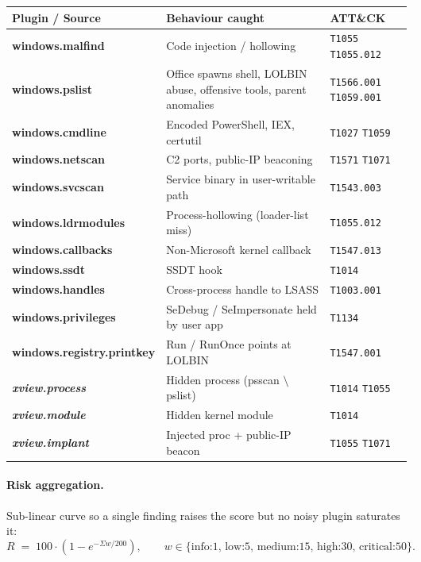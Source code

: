 \documentclass[11pt,a4paper]{article}
\newcommand{\mitre}[1]{\colorbox{accent!18}{\texttt{\footnotesize #1}}}
\begin{document}
\begin{center}
\renewcommand{\arraystretch}{1.2}
\begin{tabular}{>{\bfseries}p{3.2cm} p{6.2cm} p{4.6cm}}
\toprule
\textbf{Plugin / Source} & \textbf{Behaviour caught} & \textbf{ATT\&CK} \\
\midrule
windows.malfind        & Code injection / hollowing                   & \mitre{T1055} \mitre{T1055.012} \\
windows.pslist         & Office spawns shell, LOLBIN abuse,
                         offensive tools, parent anomalies            & \mitre{T1566.001} \mitre{T1059.001} \\
windows.cmdline        & Encoded PowerShell, IEX, certutil            & \mitre{T1027} \mitre{T1059} \\
windows.netscan        & C2 ports, public-IP beaconing                & \mitre{T1571} \mitre{T1071} \\
windows.svcscan        & Service binary in user-writable path         & \mitre{T1543.003} \\
windows.ldrmodules     & Process-hollowing (loader-list miss)         & \mitre{T1055.012} \\
windows.callbacks      & Non-Microsoft kernel callback                & \mitre{T1547.013} \\
windows.ssdt           & SSDT hook                                    & \mitre{T1014} \\
windows.handles        & Cross-process handle to LSASS                & \mitre{T1003.001} \\
windows.privileges     & SeDebug / SeImpersonate held by user app     & \mitre{T1134} \\
windows.registry.printkey & Run / RunOnce points at LOLBIN            & \mitre{T1547.001} \\
\textit{xview.process} & Hidden process (psscan $\setminus$ pslist)   & \mitre{T1014} \mitre{T1055} \\
\textit{xview.module}  & Hidden kernel module                         & \mitre{T1014} \\
\textit{xview.implant} & Injected proc + public-IP beacon             & \mitre{T1055} \mitre{T1071} \\
\bottomrule
\end{tabular}
\end{center}

\paragraph{Risk aggregation.} Sub-linear curve so a single finding raises the
score but no noisy plugin saturates it:
\[
R \;=\; 100 \cdot \left(1 - e^{-\Sigma w / 200}\right),
\qquad
w \in \{\text{info:1, low:5, medium:15, high:30, critical:50}\}.
\]
\end{document}
